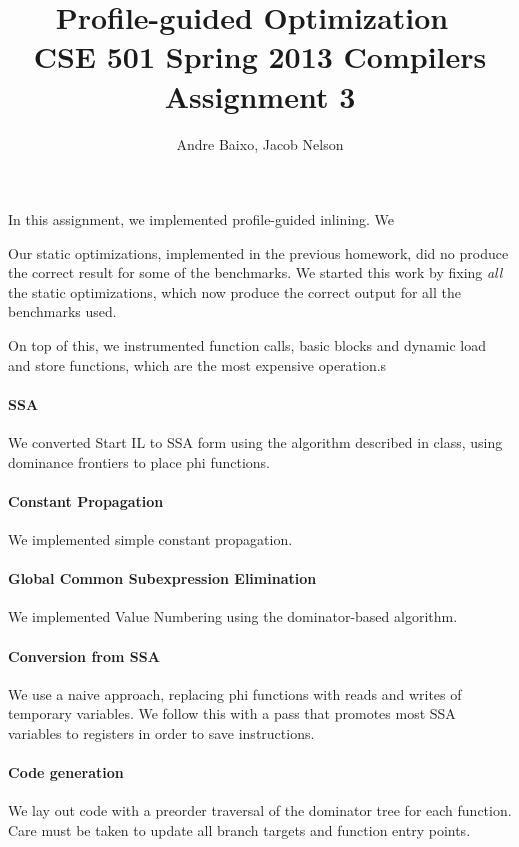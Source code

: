 \documentclass[10pt,twocolumn]{article}
\begin{document}
\title{Profile-guided Optimization\ \\
  \small CSE 501 Spring 2013 Compilers Assignment 3}
\author{Andre Baixo, Jacob Nelson}
\maketitle


In this assignment, we implemented profile-guided inlining. We 

Our static optimizations, implemented in the previous homework, did no
produce the correct result for some of the benchmarks. We started this
work by fixing \emph{all} the static optimizations, which now produce
the correct output for all the benchmarks used.

On top of this, we instrumented function calls, basic blocks and
dynamic load and store functions, which are the most expensive
operation.s


\paragraph{SSA} 
We converted Start IL to SSA form using the algorithm described in
class, using dominance frontiers to place phi functions.

\paragraph{Constant Propagation} 
We implemented simple constant propagation.

\paragraph{Global Common Subexpression Elimination} 
We implemented Value Numbering using the dominator-based algorithm.

\paragraph{Conversion from SSA} 
We use a naive approach, replacing phi functions with reads and writes
of temporary variables. We follow this with a pass that promotes most
SSA variables to registers in order to save instructions.

\paragraph{Code generation} 
We lay out code with a preorder traversal of the dominator tree for
each function. Care must be taken to update all branch targets and
function entry points.
\end{document}
